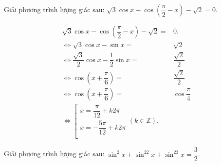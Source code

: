\begin{bt}%
	Giải phương trình lượng giác sau:  $\sqrt{3}\cos x - \cos \left(\dfrac{\pi}{2}-x\right)-\sqrt{2}=0$.
	\loigiai
	{
	
	\begin{eqnarray*}
	\sqrt{3} \cos x- \cos\left(\dfrac{\pi}{2}-x\right)-\sqrt{2}=&0. \\
	\Leftrightarrow \sqrt{3} \cos x-\sin x=&\sqrt{2}\\
	\Leftrightarrow \dfrac{\sqrt{3}}{2} \cos x-\dfrac{1}{2}\sin x=&\dfrac{\sqrt{2}}{2}\\
	\Leftrightarrow  \cos\left(x+\dfrac{\pi}{6}\right)=&\dfrac{\sqrt{2}}{2}\\
	\Leftrightarrow  \cos\left(x+\dfrac{\pi}{6}\right)=& \cos\dfrac{\pi}{4}\\
	\Leftrightarrow \left[\begin{matrix}
	x=\dfrac{\pi}{12}+k2\pi   \\
	x=-\dfrac{5\pi}{12}+k2\pi   \\
	\end{matrix}\right.\left(k\in \mathbb{Z}\right).
	\end{eqnarray*}
	
	}
\end{bt}
\begin{bt}%
	Giải phương trình lượng giác sau: $\sin^2x + \sin^22x +\sin^23x =\dfrac{3}{2}$.
	\loigiai{
			\begin{eqnarray*}
				 \sin^2x+\sin^22x+\sin^23x=&\dfrac{3}{2}. \\
				\Leftrightarrow \dfrac{1- \cos2x}{2}+\dfrac{1- \cos4x}{2}+\dfrac{1- \cos6x}{2}=&\dfrac{3}{2}\\
				\Leftrightarrow  \cos2x+ \cos4x+ \cos6x=&0\\
				\Leftrightarrow 2 \cos4x \cos2x+ \cos4x=&0\\
				\Leftrightarrow  \cos4x\left(2 \cos2x+1\right)=&0\\
				\Leftrightarrow \left[\begin{matrix}
				\cos4x=0  \\
				2 \cos2x+1=0  \\
				\end{matrix}\right.\\
				\Leftrightarrow \left[\begin{matrix}
				x=\dfrac{\pi}{8}+\dfrac{k\pi}{4}  \\
				\left[\begin{matrix}
				x=-\dfrac{\pi}{3}+k\pi   \\
				x=\dfrac{\pi}{3}+k\pi   \\
				\end{matrix}\right.  \\
				\end{matrix}\right.
		\end{eqnarray*}
	}
\end{bt}

